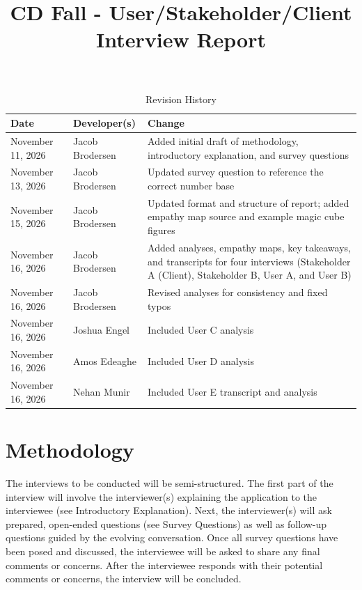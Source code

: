 \documentclass{article}
\title{CD Fall - User/Stakeholder/Client Interview Report\\\progname}
\author{\authname}
\date{}
\begin{document}
\maketitle

\newpage

\tableofcontents

\newpage

\begin{table}[hp]
\caption{Revision History} \label{TblRevisionHistory}
\begin{tabularx}{\textwidth}{llX}
\toprule
\textbf{Date} & \textbf{Developer(s)} & \textbf{Change}\\
\midrule
November 11, 2026 & Jacob Brodersen & Added initial draft of methodology, introductory explanation, and survey questions\\
November 13, 2026 & Jacob Brodersen & Updated survey question to reference the correct number base\\
November 15, 2026 & Jacob Brodersen & Updated format and structure of report; added empathy map source and example magic cube figures\\
November 16, 2026 & Jacob Brodersen & Added analyses, empathy maps, key takeaways, and transcripts for four interviews (Stakeholder A (Client), Stakeholder B, User A, and User B)\\
November 16, 2026 & Jacob Brodersen & Revised analyses for consistency and fixed typos\\
November 16, 2026 & Joshua Engel & Included User C analysis\\
November 16, 2026 & Amos Edeaghe & Included User D analysis\\
November 16, 2026 & Nehan Munir & Included User E transcript and analysis\\
\bottomrule
\end{tabularx}
\end{table}

\newpage

\section{Methodology}

The interviews to be conducted will be semi-structured. The first part of the interview will involve the interviewer(s) explaining the application to the interviewee (see Introductory Explanation). Next, the interviewer(s) will ask prepared, open-ended questions (see Survey Questions) as well as follow-up questions guided by the evolving conversation. Once all survey questions have been posed and discussed, the interviewee will be asked to share any final comments or concerns. After the interviewee responds with their potential comments or concerns, the interview will be concluded.
\end{document}
